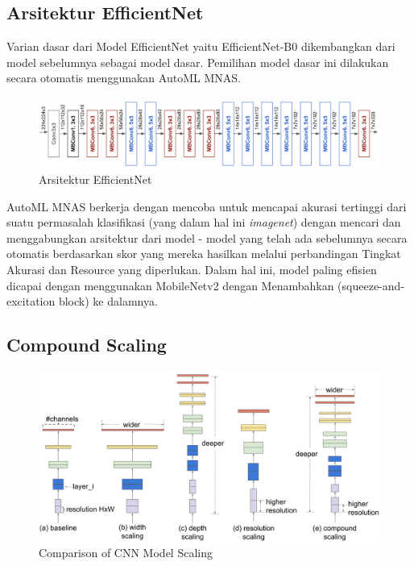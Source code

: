 \vspace{2ex}
\subsection{Arsitektur EfficientNet}
\label{subsec:arsitekturefn}
Varian dasar dari Model EfficientNet yaitu EfficientNet-B0 dikembangkan dari model sebelumnya sebagai model dasar. Pemilihan model dasar ini dilakukan secara otomatis menggunakan AutoML MNAS. 

\begin{figure}[h]
	\centering
	
	\includegraphics[width=1\columnwidth]{gambar/arsitekturefn.png}
	
	\caption{Arsitektur EfficientNet \citep{cit:effnet}}
	\label{fig:arsitektur-efn}
\end{figure}


AutoML MNAS berkerja dengan mencoba untuk mencapai akurasi tertinggi dari suatu permasalah klasifikasi (yang dalam hal ini \textit{imagenet}) dengan mencari dan menggabungkan arsitektur dari model - model yang telah ada sebelumnya secara otomatis berdasarkan skor yang mereka hasilkan melalui perbandingan Tingkat Akurasi dan Resource yang diperlukan. Dalam hal ini, model paling efisien dicapai dengan menggunakan MobileNetv2 dengan Menambahkan (squeeze-and-excitation block) ke dalamnya.

\vspace{2ex}
\subsection{Compound Scaling}
\label{subsec:compoundscaling}
\begin{figure}[h]
	\centering
	
	\includegraphics[width=0.9\columnwidth]{gambar/modelscaling.png}
	
	\caption{Comparison of CNN Model Scaling \citep{cit:effnet}}
	\label{fig:modelscaling}
\end{figure}


